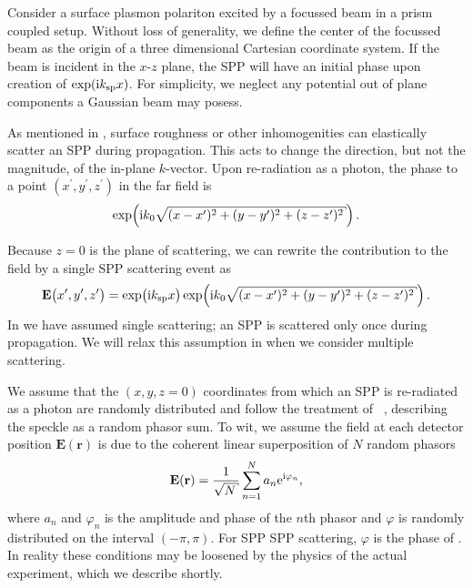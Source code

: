 Consider a surface plasmon polariton excited by a focussed beam in a prism
coupled setup.  Without loss of generality, we define the center of the
focussed beam as the origin of a three dimensional Cartesian coordinate
system.  If the beam is incident in the $x$-$z$ plane, the SPP will have an
initial phase upon creation of $\exp({\mathrm{i}} k_\mathrm{sp} x)$.  For simplicity, we
neglect any potential out of plane components a Gaussian beam may posess. 

As mentioned in , surface roughness or other
inhomogenities can elastically scatter an SPP during propagation.  This
acts to change the direction, but not the magnitude, of the in-plane
$k$-vector.  Upon re-radiation as a photon, the phase to a point
$(x^\prime,y^\prime,z^\prime)$ in the far field is 
\begin{equation}
\exp\!\left(\mi k_0 \sqrt{ (x-x^\prime)^2 + (y-y^\prime)^2 + (z-z^\prime)^2}\right).
\end{equation}

Because $z=0$ is the plane of scattering, we can rewrite the contribution
to the field by a single SPP scattering event as
\begin{equation}
\mathbf{E}\big(x^\prime,y^\prime,z^\prime\big)=\exp\!\big( \mi \ksp x \big)
\exp\!\left(\mi k_0 \sqrt{ (x-x^\prime)^2 + (y-y^\prime)^2 + (z-z^\prime)^2}\right).
\label{eqn:sppsinglescattering}
\end{equation}
In  we have assumed single scattering; an
SPP is scattered only once during propagation.  We will relax this
assumption in  when we consider multiple
scattering.

We assume that the $(x,y,z=0)$ coordinates from which an SPP is re-radiated
as a photon are randomly distributed and follow the treatment of
~\cite{goodman2007speckle}, describing the speckle as a
random phasor sum.  To wit, we assume the field at each detector position
$\mathbf{E}(\mathbf{r})$ is due to the coherent linear superposition of $N$
random phasors
\begin{equation}
\mathbf{E}(\mathbf{r}) = \frac{1}{\sqrt{N}} \sum_{n=1}^{N} a_n \me^{\mi \varphi_n},
\label{eqn:phasorsum}
\end{equation}
where $a_n$ and $\varphi_n$ is the amplitude and phase of the $n$th phasor 
and $\varphi$ is randomly distributed on the interval $(-\pi,\pi)$.  For SPP
SPP scattering, $\varphi$ is the phase of .
In reality these conditions may be loosened by the physics of the actual
experiment, which we describe shortly.

